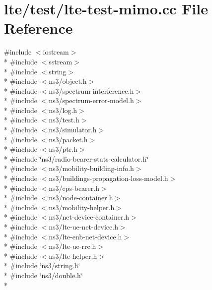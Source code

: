 \hypertarget{lte-test-mimo_8cc}{}\section{lte/test/lte-\/test-\/mimo.cc File Reference}
\label{lte-test-mimo_8cc}
{\ttfamily \#include $<$iostream$>$}\\*
{\ttfamily \#include $<$sstream$>$}\\*
{\ttfamily \#include $<$string$>$}\\*
{\ttfamily \#include $<$ns3/object.\+h$>$}\\*
{\ttfamily \#include $<$ns3/spectrum-\/interference.\+h$>$}\\*
{\ttfamily \#include $<$ns3/spectrum-\/error-\/model.\+h$>$}\\*
{\ttfamily \#include $<$ns3/log.\+h$>$}\\*
{\ttfamily \#include $<$ns3/test.\+h$>$}\\*
{\ttfamily \#include $<$ns3/simulator.\+h$>$}\\*
{\ttfamily \#include $<$ns3/packet.\+h$>$}\\*
{\ttfamily \#include $<$ns3/ptr.\+h$>$}\\*
{\ttfamily \#include \char`\"{}ns3/radio-\/bearer-\/stats-\/calculator.\+h\char`\"{}}\\*
{\ttfamily \#include $<$ns3/mobility-\/building-\/info.\+h$>$}\\*
{\ttfamily \#include $<$ns3/buildings-\/propagation-\/loss-\/model.\+h$>$}\\*
{\ttfamily \#include $<$ns3/eps-\/bearer.\+h$>$}\\*
{\ttfamily \#include $<$ns3/node-\/container.\+h$>$}\\*
{\ttfamily \#include $<$ns3/mobility-\/helper.\+h$>$}\\*
{\ttfamily \#include $<$ns3/net-\/device-\/container.\+h$>$}\\*
{\ttfamily \#include $<$ns3/lte-\/ue-\/net-\/device.\+h$>$}\\*
{\ttfamily \#include $<$ns3/lte-\/enb-\/net-\/device.\+h$>$}\\*
{\ttfamily \#include $<$ns3/lte-\/ue-\/rrc.\+h$>$}\\*
{\ttfamily \#include $<$ns3/lte-\/helper.\+h$>$}\\*
{\ttfamily \#include \char`\"{}ns3/string.\+h\char`\"{}}\\*
{\ttfamily \#include \char`\"{}ns3/double.\+h\char`\"{}}\\*
